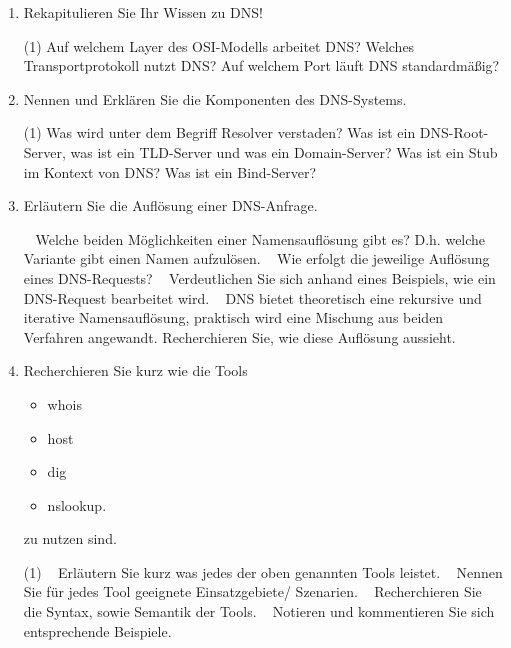 \documentclass[paper=a4,fontsize=11pt]{scrartcl}%
\numberwithin{equation}{section}
\begin{document}
\begin{enumerate}
	\item Rekapitulieren Sie Ihr Wissen zu DNS!
	\begin{tasks}(1)
		\task Auf welchem Layer des OSI-Modells arbeitet DNS?
		\task Welches Transportprotokoll nutzt DNS?
		\task Auf welchem Port läuft DNS standardmäßig?
	\end{tasks}
	\item Nennen und Erklären Sie die Komponenten des DNS-Systems.
	\begin{tasks}(1)
		\task Was wird unter dem Begriff Resolver verstaden?
		\task Was ist ein DNS-Root-Server, was ist ein TLD-Server und was ein Domain-Server?
		\task Was ist ein Stub im Kontext von DNS?
		\task Was ist ein Bind-Server?
	\end{tasks}
	\item Erläutern Sie die Auflösung einer DNS-Anfrage.
	\begin{tasks}
		\task~ Welche beiden Möglichkeiten einer Namensauflösung gibt es? D.h. welche Variante gibt einen Namen aufzulösen.
		\task~ Wie erfolgt die jeweilige Auflösung eines DNS-Requests?
		\task~ Verdeutlichen Sie sich anhand eines Beispiels, wie ein DNS-Request bearbeitet wird.
		\task~ DNS bietet theoretisch eine rekursive und iterative Namensauflösung, praktisch wird eine Mischung aus beiden Verfahren angewandt. Recherchieren Sie, wie diese Auflösung aussieht.
	\end{tasks}
	\item Recherchieren Sie kurz wie die Tools
	\begin{multicols}{4}
	\begin{itemize}
	\item whois 
	\item host
	\item dig
	\item nslookup.
	\end{itemize}
	\end{multicols}
	zu nutzen sind.
	\begin{tasks}(1)
		\task~ Erläutern Sie kurz was jedes der oben genannten Tools leistet.
		\task~ Nennen Sie für jedes Tool geeignete Einsatzgebiete/ Szenarien.
		\task~ Recherchieren Sie die Syntax, sowie Semantik der Tools.
		\task~ Notieren und kommentieren Sie sich entsprechende Beispiele. 
	\end{tasks}
\end{enumerate}
\end{document}
